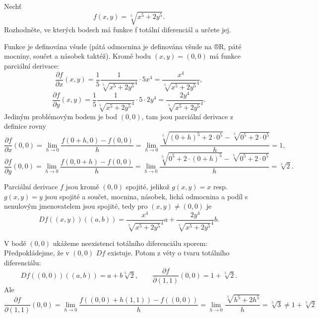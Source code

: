 \documentclass[12pt]{article}                   %
\begin{document}
\pagebreak
\begin{priklad}[1.3]
	Nechť
	$$ f(x, y) = \sqrt[5]{x^5 + 2y^5}. $$
	Rozhodněte, ve kterých bodech má funkce f totální diferenciál a určete jej.

	\begin{reseni}
		Funkce je definována všude (pátá odmocnina je definována všude na ®R, páté mocniny, součet a násobek taktéž). Kromě bodu $(x, y) = (0, 0)$ má funkce parciální derivace:
		$$ \frac{\partial f}{\partial x}(x, y) = \frac{1}{5}\frac{1}{\sqrt[5]{x^5 + 2y^5}^4}·5x^4 = \frac{x^4}{\sqrt[5]{x^5 + 2y^5}^4}, $$
		$$ \frac{\partial f}{\partial y}(x, y) = \frac{1}{5}\frac{1}{\sqrt[5]{x^5 + 2y^5}^4}·5·2y^4 = \frac{2y^4}{\sqrt[5]{x^5 + 2y^5}^4}. $$
		Jediným problémovým bodem je bod $(0, 0)$, tam jsou parciální derivace z definice rovny
		$$ \frac{\partial f}{\partial x}(0, 0) = \lim_{h \rightarrow 0}\frac{f(0 + h, 0) - f(0, 0)}{h} = \lim_{h \rightarrow 0}\frac{\sqrt[5]{(0 + h)^5 + 2·0^5} - \sqrt[5]{0^5 + 2·0^5}}{h} %
		= 1, $$
		$$ \frac{\partial f}{\partial y}(0, 0) = \lim_{h \rightarrow 0}\frac{f(0, 0 + h) - f(0, 0)}{h} = \lim_{h \rightarrow 0}\frac{\sqrt[5]{0^5 + 2·(0 + h)^5} - \sqrt[5]{0^5 + 2·0^5}}{h} %
		= \sqrt[5]{2}. $$	
	\end{reseni}
	
	\begin{reseni}
		Parciální derivace $f$ jsou kromě $(0, 0)$ spojité, jelikož $g(x, y) = x$ resp. $g(x, y) = y$ jsou spojité a součet, mocnina, násobek, lichá odmocnina a podíl s nenulovým jmenovatelem jsou spojité, tedy pro $(x, y) ≠ (0, 0)$ je
		$$ Df((x, y))((a, b)) = \frac{x^4}{\sqrt[5]{x^5 + 2y^5}^4}a + \frac{2y^4}{\sqrt[5]{x^5 + 2y^5}^4}b. $$

		V bodě $(0, 0)$ ukážeme neexistenci totálního diferenciálu sporem: Předpokládejme, že v $(0, 0)$ $Df$ existuje. Potom z věty o tvaru totálního diferenciálu:
		$$ Df((0, 0))((a, b)) = a + b\sqrt[5]{2}, \qquad \frac{\partial f}{\partial (1, 1)}(0, 0) = 1 + \sqrt[5]{2}. $$
		Ale
		$$ \frac{\partial f}{\partial (1, 1)}(0, 0) = \lim_{h \rightarrow 0}\frac{f((0, 0) + h(1, 1)) - f((0, 0))}{h} = \lim_{h \rightarrow 0} \frac{\sqrt[5]{h^5 + 2h^5}}{h} = \sqrt[5]{3} ≠ 1 + \sqrt[5]{2} $$
	\end{reseni}
\end{priklad}
\end{document}
